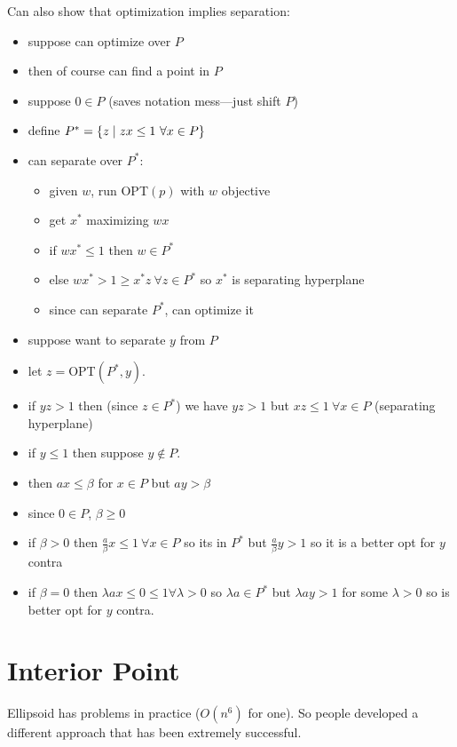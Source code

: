 \documentclass{article}
\begin{document}
Can also show that optimization implies separation:
\begin{itemize}
\item suppose can optimize over $P$
\item then of course can find a point in $P$
\item suppose $0\in P$ (saves notation mess---just shift $P$)
\item define $P^* = \set{z \mid zx \le 1\ \forall x \in P}$
\item can separate over $P^*$:  
\begin{itemize}
\item given $w$, run OPT$(p)$ with $w$ objective
\item get $x^*$ maximizing $wx$
\item if $wx^* \le 1$ then $w \in P^*$
\item else $wx^* > 1 \ge x^*z \ \forall z \in P^*$ so $x^*$ is separating
  hyperplane 
\item since can separate $P^*$, can optimize it
\end{itemize}
\item suppose want to separate $y$ from $P$
\item let $z=$OPT$(P^*,y)$.  
\item if $yz>1$ then (since $z \in P^*$) we have $yz>1$ but $xz \le 1
  \ \forall x \in P$ (separating hyperplane)
\item if $y \le 1$ then suppose $y \notin P$.  
\item then $ax \le \beta$ for $x \in P$ but $ay > \beta$
\item since $0 \in P$, $\beta \ge 0$
\item if $\beta > 0$ then $\frac{a}{\beta}x \le 1\ \forall x \in P$ so
  its in $P^*$ but
  $\frac{a}{\beta}y > 1$ so it is a better opt for $y$ contra
\item if $\beta = 0$ then $\lambda ax \le 0 \le 1 \forall \lambda>0$
  so $\lambda a \in P^*$
  but $\lambda a y>1$ for some $\lambda>0$ so is better opt for $y$
  contra.
\end{itemize}


\section{Interior Point}

Ellipsoid has problems in practice ($O(n^6)$ for one).  So people
developed a different approach that has been extremely successful.
\end{document}
